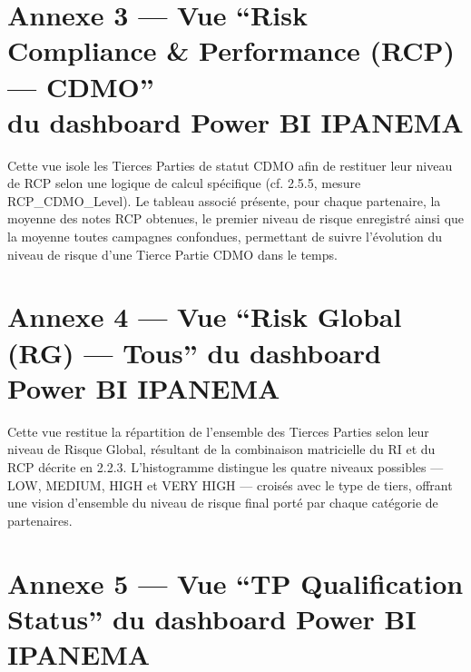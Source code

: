 \section*{Annexe 3 — Vue ``Risk Compliance \& Performance (RCP) — CDMO''\\du dashboard Power BI IPANEMA}

Cette vue isole les Tierces Parties de statut CDMO afin de restituer leur niveau de
RCP selon une logique de calcul spécifique (cf. 2.5.5, mesure RCP\_CDMO\_Level). Le
tableau associé présente, pour chaque partenaire, la moyenne des notes RCP obtenues, le
premier niveau de risque enregistré ainsi que la moyenne toutes campagnes confondues,
permettant de suivre l'évolution du niveau de risque d'une Tierce Partie CDMO dans le
temps.

\begin{figure}[H]
    \centering
    \label{fig:annexe3_rcp_cdmo}
\end{figure}

\section*{Annexe 4 — Vue ``Risk Global (RG) — Tous'' du dashboard Power BI IPANEMA}

Cette vue restitue la répartition de l'ensemble des Tierces Parties selon leur niveau
de Risque Global, résultant de la combinaison matricielle du RI et du RCP décrite en 2.2.3.
L'histogramme distingue les quatre niveaux possibles — LOW, MEDIUM, HIGH et VERY
HIGH — croisés avec le type de tiers, offrant une vision d'ensemble du niveau de risque final
porté par chaque catégorie de partenaires.

\begin{figure}[H]
    \centering
    \label{fig:annexe4_risk_global_tous}
\end{figure}

\section*{Annexe 5 — Vue ``TP Qualification Status'' du dashboard Power BI IPANEMA}

